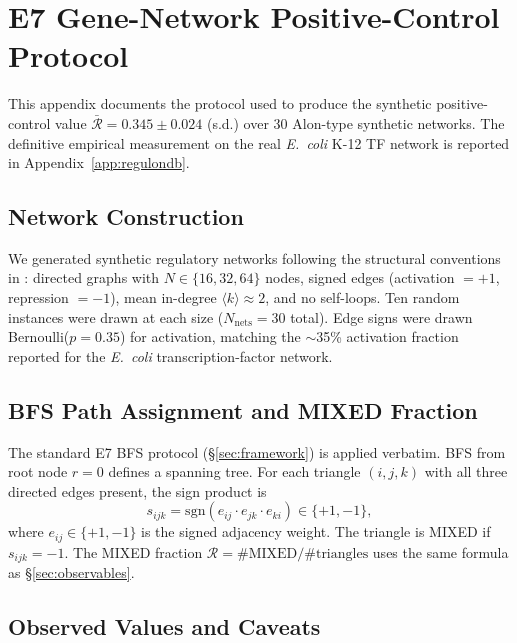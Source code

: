 \documentclass[12pt,a4paper]{article}
\newcommand{\R}{\mathcal{R}}           %
\theoremstyle{plain}
\theoremstyle{definition}
\theoremstyle{remark}
\begin{document}

\section{E7 Gene-Network Positive-Control Protocol}
\label{app:geneprotocol}

This appendix documents the protocol used to produce the synthetic positive-control value
$\bar{\R}=0.345\pm0.024$ (s.d.) over 30 Alon-type synthetic networks.
The definitive empirical measurement on the real \textit{E.~coli} K-12
TF network is reported in Appendix~\ref{app:regulondb}.

\subsection*{Network Construction}

We generated synthetic regulatory networks following the structural conventions
in \citet{Alon2007}: directed graphs with $N\in\{16,32,64\}$ nodes, signed edges
(activation $=+1$, repression $=-1$), mean in-degree $\langle k\rangle\approx2$,
and no self-loops.  Ten random instances were drawn at each size ($N_\text{nets}=30$
total).  Edge signs were drawn Bernoulli($p=0.35$) for activation, matching the
$\sim$35\% activation fraction reported for the \textit{E.~coli}
transcription-factor network.

\subsection*{BFS Path Assignment and MIXED Fraction}

The standard E7 BFS protocol (§\ref{sec:framework}) is applied verbatim.
BFS from root node $r=0$ defines a spanning tree.  For each triangle
$(i,j,k)$ with all three directed edges present, the sign product is
\begin{equation}
  s_{ijk} = \mathrm{sgn}(e_{ij}\cdot e_{jk}\cdot e_{ki})\in\{+1,-1\},
\end{equation}
where $e_{ij}\in\{+1,-1\}$ is the signed adjacency weight.  The triangle is MIXED
if $s_{ijk}=-1$.  The MIXED fraction
$\R = \#\text{MIXED}/\#\text{triangles}$ uses the same formula as §\ref{sec:observables}.

\subsection*{Observed Values and Caveats}
\end{document}

